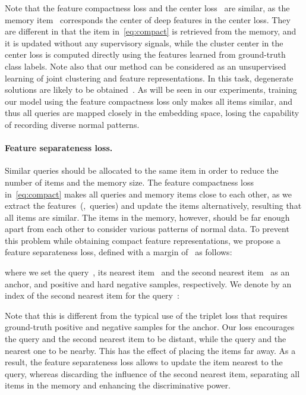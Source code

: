 \documentclass[10pt,twocolumn,letterpaper]{article}
\begin{document}
Note that the feature compactness loss and the center loss~\cite{wen2016discriminative} are similar, as the memory item~ corresponds the center of deep features in the center loss. They are different in that the item in~\eqref{eq:compact} is retrieved from the memory, and it is updated without any supervisory signals, while the cluster center in the center loss is computed directly using the features learned from ground-truth class labels. Note also that our method can be considered as an unsupervised learning of joint clustering and feature representations. In this task, degenerate solutions are likely to be obtained~\cite{wen2016discriminative,yang2016joint}. As will be seen in our experiments, training our model using the feature compactness loss only makes all items similar, and thus all queries are mapped closely in the embedding space, losing the capability of recording diverse normal patterns. 

\vspace{-0.4cm}			
		\paragraph{Feature separateness loss.}
			Similar queries should be allocated to the same item in order to reduce the number of items and the memory size. The feature compactness loss in~\eqref{eq:compact} makes all queries and memory items close to each other, as we extract the features~(\ie,~queries) and update the items alternatively, resulting that all items are similar. The items in the memory, however, should be far enough apart from each other to consider various patterns of normal data. To prevent this problem while obtaining compact feature representations, we propose a feature separateness loss, defined with a margin of~ as follows:
			
			where we set the query~, its nearest item~ and the second nearest item~ as an anchor, and positive and hard negative samples, respectively. We denote by  an index of the second nearest item for the query~:
			
			Note that this is different from the typical use of the triplet loss that requires ground-truth positive and negative samples for the anchor. Our loss encourages the query and the second nearest item to be distant, while the query and the nearest one to be nearby. This has the effect of placing the items far away. As a result, the feature separateness loss allows to update the item nearest to the query, whereas discarding the influence of the second nearest item, separating all items in the memory and enhancing the discriminative power.
		
\end{document}

